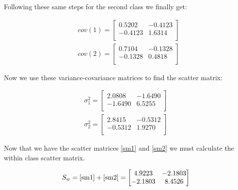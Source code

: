 \documentclass[12pt]{article}
\begin{document}
\noindent
Following these same steps for the second class we finally get:
\begin{center}

\begin{align*}
&cov(1)=\begin{bmatrix}
0.5202& -0.4123\\
-0.4123 & 1.6314\\
\end{bmatrix} \\
&cov(2) = \begin{bmatrix}
0.7104 & -0.1328\\
-0.1328 & 0.4818\\
\end{bmatrix}
\end{align*}
\end{center}

Now we use these variance-covariance matrices to find the scatter matrix:
\begin{center}

\begin{align}
\sigma_{1}^{2} = \begin{bmatrix}
2.0808 & -1.6490\\
-1.6490 & 6.5255\\
\end{bmatrix} \label{sm1}\\
\sigma_{2}^{2} = \begin{bmatrix}
2.8415 & -0.5312\\
-0.5312 & 1.9270\\
\end{bmatrix} \label{sm2}
\end{align}
\end{center}

Now that we have the scatter matrices \ref{sm1} and \ref{sm2} we must calculate the within class scatter matrix.

\begin{center}

\begin{align}
S_{w} = \ref{sm1} + \ref{sm2} = \begin{bmatrix}
4.9223 & -2.1803\\
-2.1803 & 8.4526\\
\end{bmatrix} \label{wcsm}
\end{align}
\end{center}
\end{document}
